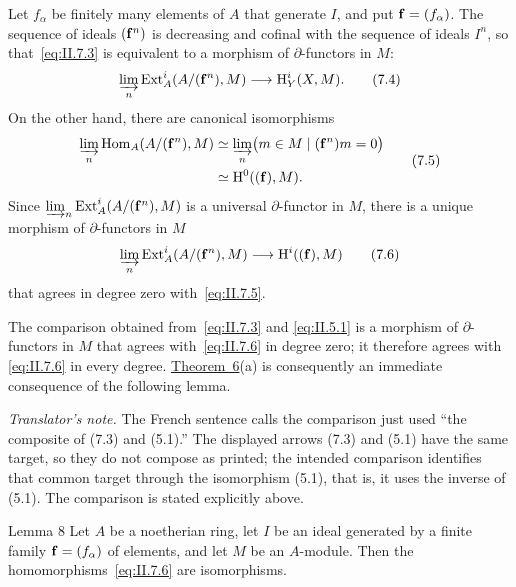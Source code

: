 Let $f_\alpha$ be finitely many elements of $A$ that generate $I$, and put
$\mathbf f=(f_\alpha)$. The sequence of ideals $(\mathbf f^n)$ is decreasing and
cofinal with the sequence of ideals $I^n$, so that~\eqref{eq:II.7.3} is
equivalent to a morphism of $\partial$-functors in $M$:
\begin{equation}
  \varinjlim_n\operatorname{Ext}_A^i(A/(\mathbf f^n),M)
  \longrightarrow \mathrm H_Y^i(X,M).
  \tag{7.4}\label{eq:II.7.4}
\end{equation}
On the other hand, there are canonical isomorphisms
\begin{equation}
\begin{split}
  \varinjlim_n\operatorname{Hom}_A(A/(\mathbf f^n),M)
  &\simeq \varinjlim_n
    \bigl(m\in M\mid(\mathbf f^n)m=0\bigr) \\
  &\simeq \mathrm H^0((\mathbf f),M).
\end{split}
  \tag{7.5}\label{eq:II.7.5}
\end{equation}
Since $\varinjlim_n\operatorname{Ext}_A^i(A/(\mathbf f^n),M)$ is a universal
$\partial$-functor in $M$, there is a unique morphism of $\partial$-functors
in $M$
\begin{equation}
  \varinjlim_n\operatorname{Ext}_A^i(A/(\mathbf f^n),M)
  \longrightarrow \mathrm H^i((\mathbf f),M)
  \tag{7.6}\label{eq:II.7.6}
\end{equation}
that agrees in degree zero with~\eqref{eq:II.7.5}.

The comparison obtained from~\eqref{eq:II.7.3} and
\eqref{eq:II.5.1} is a morphism of $\partial$-functors in $M$ that agrees
with~\eqref{eq:II.7.6} in degree zero; it therefore agrees with
\eqref{eq:II.7.6} in every degree. \hyperref[II.6]{Theorem~6}(a) is consequently an immediate
consequence of the following lemma.

\noindent\textit{Translator's note.} The French sentence calls the
comparison just used ``the composite of (7.3) and (5.1).'' The displayed
arrows (7.3) and (5.1) have the same target, so they do not compose as
printed; the intended comparison identifies that common target through the
isomorphism (5.1), that is, it uses the inverse of (5.1). The comparison is
stated explicitly above.

\begin{sgastatement}{Lemma 8}
Let $A$ be a noetherian ring, let $I$ be an ideal generated by a finite
family $\mathbf f=(f_\alpha)$ of elements, and let $M$ be an $A$-module. Then the
homomorphisms~\eqref{eq:II.7.6} are isomorphisms.
\end{sgastatement}

